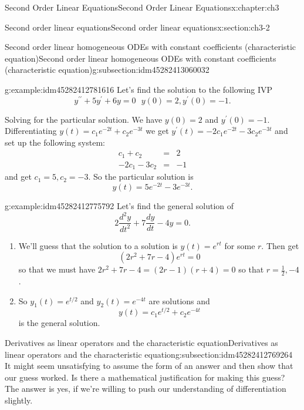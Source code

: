 \documentclass[oneside,10pt,]{book}
\numberwithin{equation}{section}
\numberwithin{equation}{section}
\newcommand{\amp}{&}
\begin{document}
\begin{chapterptx}{Second Order Linear Equations}{}{Second Order Linear Equations}{}{}{x:chapter:ch3}
\begin{sectionptx}{Second order linear equations}{}{Second order linear equations}{}{}{x:section:ch3-2}
\begin{subsectionptx}{Second order linear homogeneous ODEs with constant coefficients (characteristic equation)}{}{Second order linear homogeneous ODEs with constant coefficients (characteristic equation)}{}{}{g:subsection:idm45282413060032}
\begin{example}{}{g:example:idm45282412781616}
Let's find the solution to the following IVP%
\begin{equation*}
y^{\prime\prime}+5y^{\prime}+6y=0\,\,\,\,y(0)=2,y^{\prime}(0)=-1.
\end{equation*}
%
\par
Solving for the particular solution. We have \(y(0)=2\) and \(y^{\prime}(0)=-1\). Differentiating \(y(t)=c_{1}e^{-2t}+c_{2}e^{-3t}\) we get \(y^{\prime}(t)=-2c_{1}e^{-2t}-3c_{2}e^{-3t}\) and set up the following system:%
\begin{align*}
c_{1}+c_{2} \amp = \amp 2\\
-2c_{1}-3c_{2} \amp = \amp -1
\end{align*}
and get \(c_{1}=5,c_{2}=-3\). So the particular solution is%
\begin{equation*}
y(t)=5e^{-2t}-3e^{-3t}.
\end{equation*}
%
\end{example}
\begin{example}{}{g:example:idm45282412775792}%
Let's find the general solution of%
\begin{equation*}
2\frac{d^{2}y}{dt^{2}}+7\frac{dy}{dt}-4y=0.
\end{equation*}
%
%
\begin{enumerate}
\item{}We'll guess that the solution to a solution is \(y(t)=e^{rt}\) for some \(r\). Then get%
\begin{equation*}
\left(2r^{2}+7r-4\right)e^{rt}=0
\end{equation*}
so that we must have \(2r^{2}+7r-4=\left(2r-1\right)\left(r+4\right)=0\) so that \(r=\frac{1}{2},-4\).%
\item{}So \(y_{1}(t)=e^{t/2}\) and \(y_{2}(t)=e^{-4t}\) are solutions and%
\begin{equation*}
y(t)=c_{1}e^{t/2}+c_{2}e^{-4t}
\end{equation*}
is the general solution.%
\end{enumerate}
\end{example}
\end{subsectionptx}
%
%
\typeout{************************************************}
\typeout{************************************************}
%
\begin{subsectionptx}{Derivatives as linear operators and the characteristic equation}{}{Derivatives as linear operators and the characteristic equation}{}{}{g:subsection:idm45282412769264}
It might seem unsatisfying to assume the form of an answer and then show that our guess worked. Is there a mathematical justification for making this guess? The answer is yes, if we're willing to push our understanding of differentiation slightly.%

\end{subsectionptx}
\end{sectionptx}
\end{chapterptx}
\end{document}
